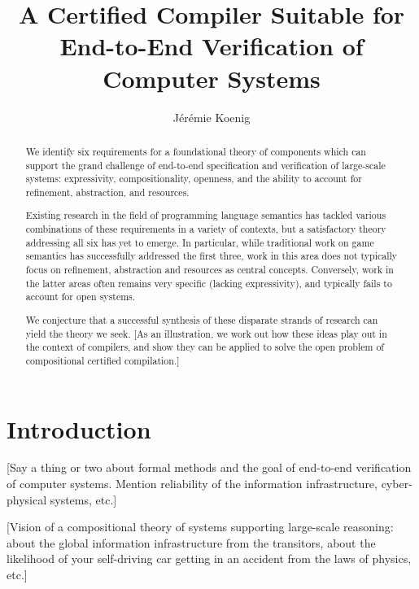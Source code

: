 \documentclass[sigplan,10pt,review,anonymous]{acmart}
\begin{document}
\title[%
  A Compiler Suitable for End-to-End Verification%
]{%
  A Certified Compiler Suitable for End-to-End Verification of Computer Systems%
}

\author{J\'er\'emie Koenig}

\begin{abstract} %
We identify six requirements
for a foundational theory of components
which can support the grand challenge of
end-to-end specification and verification of large-scale systems:
expressivity,
compositionality,
openness,
and the ability to account for
refinement,
abstraction,
and resources.

Existing research
in the field of programming language semantics
has tackled various combinations of these requirements
in a variety of contexts,
but a satisfactory theory addressing all six has yet to emerge.
In particular,
while traditional work on game semantics
has successfully addressed the first three,
work in this area does not typically focus
on refinement, abstraction and resources as central concepts.
Conversely,
work in the latter areas
often remains very specific (lacking expressivity),
and typically fails to account for open systems.

We conjecture that
a successful synthesis of these disparate strands of research
can yield the theory we seek.
[As an illustration,
we work out how these ideas play out in the context of compilers,
and show they can be applied
to solve the open problem of compositional certified compilation.]
\end{abstract}

\maketitle

\section{Introduction} %

[Say a thing or two about formal methods and
the goal of end-to-end verification of computer systems.
Mention reliability of the information infrastructure,
cyber-physical systems, etc.]

[Vision of a compositional theory of systems
supporting large-scale reasoning:
about the global information infrastructure from the transitors,
about the likelihood of your self-driving car getting in an accident
from the laws of physics, etc.]
\end{document}
